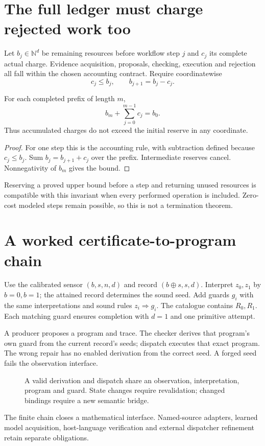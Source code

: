 \section{The full ledger must charge rejected work too}
Let $b_j\in\mathbb N^d$ be remaining resources before workflow step $j$ and $c_j$ its complete actual charge. Evidence acquisition, proposals, checking, execution and rejection all fall within the chosen accounting contract. Require coordinatewise
\[
c_j\le b_j,\qquad b_{j+1}=b_j-c_j.
\]
\begin{Coreproposition}
For each completed prefix of length $m$,
\[
b_m+\sum_{j=0}^{m-1}c_j=b_0.
\]
Thus accumulated charges do not exceed the initial reserve in any coordinate.
\end{Coreproposition}
\begin{proof}
For one step this is the accounting rule, with subtraction defined because $c_j\le b_j$. Sum $b_j=b_{j+1}+c_j$ over the prefix. Intermediate reserves cancel. Nonnegativity of $b_m$ gives the bound.
\end{proof}
Reserving a proved upper bound before a step and returning unused resources is compatible with this invariant when every performed operation is included. Zero-cost modeled steps remain possible, so this is not a termination theorem.

\section{A worked certificate-to-program chain}
Use the calibrated sensor $(b,s,n,d)$ and record $(b\oplus s,s,d)$. Interpret $z_0,z_1$ by $b=0,b=1$; the attained record determines the sound seed. Add guards $g_i$ with the same interpretations and sound rules $z_i\Rightarrow g_i$. The catalogue contains $R_0,R_1$. Each matching guard ensures completion with $d=1$ and one primitive attempt.

A producer proposes a program and trace. The checker derives that program's own guard from the current record's seeds; dispatch executes that exact program. The wrong repair has no enabled derivation from the correct seed. A forged seed fails the observation interface.
\begin{figure}[htbp]\centering
{}
\caption{A valid derivation and dispatch share an observation, interpretation, program and guard. State changes require revalidation; changed bindings require a new semantic bridge.}
\end{figure}
The finite chain closes a mathematical interface. Named-source adapters, learned model acquisition, host-language verification and external dispatcher refinement retain separate obligations.


